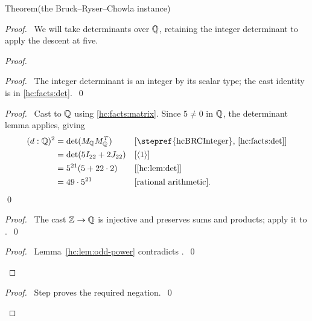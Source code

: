 \begin{mergedproofsection}
\begin{namedresult}{Theorem}{(the Bruck--Ryser--Chowla instance)}\label{hc:thm:BRC}
 \leavevmode\par
\end{namedresult}
\begin{proof}
 \pfsketch\ We will take determinants over ${\mathbb Q}$, retaining
 the integer determinant to apply the descent at five.
 \begin{proof}
  \begin{proof}\pf\ The integer determinant is an integer by its
   scalar type; the cast identity is  in
   \ref{hc:facts:det}.~\qed\end{proof}
  \begin{proof}
   \pf\ Cast  to ${\mathbb Q}$ using \ref{hc:facts:matrix}.
   Since $5\ne0$ in ${\mathbb Q}$, the determinant lemma applies, giving
   \begin{align*}
    (d:\rats)^2&=\det(M_{\rats}M_{\rats}^T)
       &&\text{[\stepref{hcBRCInteger}, \ref{hc:facts:det}]}\\
     &=\det(5I_{22}+2J_{22}) &&\text{[\asm{1}]}\\
     &=5^{21}(5+22\cdot2) &&\text{[\ref{hc:lem:det}]}\\
     &=49\cdot5^{21} &&\text{[rational arithmetic].}
   \end{align*}\qed
  \end{proof}
  \begin{proof}\pf\ The cast ${\mathbb Z}\to{\mathbb Q}$ is injective and
   preserves sums and products; apply it to .~\qed\end{proof}
  \qedstep
  \begin{proof}\pf\ Lemma~\ref{hc:lem:odd-power} contradicts
   .~\qed\end{proof}
 \end{proof}
 \qedstep
 \begin{proof}\pf\ Step  proves the required negation.~\qed\end{proof}
\end{proof}


\end{mergedproofsection}
